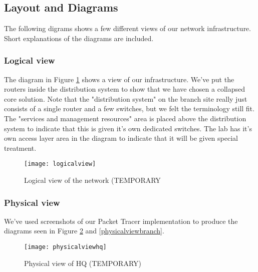 \subsection{Layout and Diagrams}


The following digrams shows a few different views of our network infrastructure. Short explanations of the diagrams are included.

\subsubsection{Logical view}


The diagram in Figure \ref{logicalview} shows a view of our infrastructure. We've put the routers inside the distribution system to show that we have chosen a collapsed core solution. Note that the "distribution system" on the branch site really just consists of a single router and a few switches, but we felt the terminology still fit. The "services and management resources" area is placed above the distribution system to indicate that this is given it's own dedicated switches. The lab has it's own access layer area in the diagram to indicate that it will be given special treatment.

\begin{figure}[H]
\caption{Logical view of the network (TEMPORARY}
\centering
\texttt{[image: logicalview]}
\label{logicalview}
\end{figure}

\subsubsection{Physical view}

We've used screenshots of our Packet Tracer implementation to produce the diagrams seen in Figure \ref{physicalviewhq} and \ref{physicalviewbranch}.


\begin{figure}[H]
\caption{Physical view of HQ (TEMPORARY)}
\centering
\texttt{[image: physicalviewhq]}
\label{physicalviewhq}
\end{figure}

